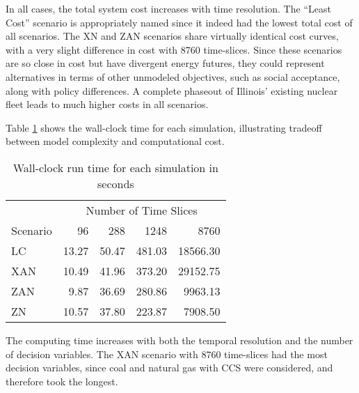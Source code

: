 In all cases, the total system cost increases with time resolution. The ``Least
Cost'' scenario is appropriately named since it indeed had the lowest total cost
of all scenarios. The XN and ZAN scenarios share virtually identical cost curves,
with a very slight difference in cost with 8760 time-slices. Since these scenarios
are so close in cost but have divergent energy futures, they could represent
alternatives in terms of other unmodeled objectives, such as social acceptance,
along with policy differences. A complete phaseout of Illinois' existing nuclear
fleet leads to much higher costs in all scenarios.


Table \ref{tab:time_res_clock} shows the
wall-clock time for each simulation, illustrating tradeoff between model
complexity and computational cost.

\begin{table}[H]
  \centering
  \caption{Wall-clock run time for each simulation in seconds}
  \label{tab:time_res_clock}
  \begin{tabular}{l*{4}{r}}
    \toprule
    & \multicolumn{4}{c}{Number of Time Slices}\\
    Scenario & 96 & 288 & 1248&8760\\
    \midrule
    LC &13.27&50.47&481.03&18566.30\\
    XAN &10.49&41.96&373.20&29152.75\\
    ZAN &9.87&36.69&280.86&9963.13\\
    ZN & 10.57&37.80&223.87&7908.50\\
    \bottomrule
  \end{tabular}
\end{table}

The computing time increases with both the temporal resolution and the number of
decision variables. The XAN scenario with 8760 time-slices had the most decision
variables, since coal and natural gas with CCS were considered, and therefore took
the longest.

